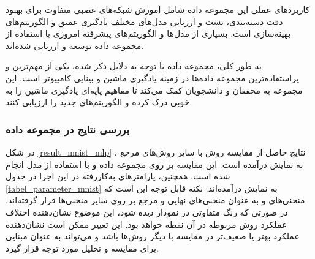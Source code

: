 کاربردهای عملی این مجموعه داده شامل آموزش شبکه‌های عصبی متفاوت برای بهبود دقت دسته‌بندی، تست و ارزیابی مدل‌های مختلف یادگیری عمیق و الگوریتم‌های بهینه‌سازی است. بسیاری از مدل‌ها و الگوریتم‌های پیشرفته امروزی با استفاده از مجموعه داده
توسعه و ارزیابی شده‌اند.

به طور کلی، مجموعه داده
با توجه به دلایل ذکر شده، یکی از مهم‌ترین و پراستفاده‌ترین مجموعه داده‌ها در زمینه یادگیری ماشین و بینایی کامپیوتر است. این مجموعه به محققان و دانشجویان کمک می‌کند تا مفاهیم پایه‌ای یادگیری ماشین را به خوبی درک کرده و الگوریتم‌های جدید را ارزیابی کنند.


\vspace{3mm}
\subsubsection{
	بررسی نتایج در مجموعه داده
}\vspace{-1mm}

در شکل
\ref{result_mnist_mlp}%
، نتایج حاصل از مقایسه روش
با سایر روش‌های مرجع به نمایش درآمده است. این مقایسه بر روی مجموعه داده
و با استفاده از مدل
انجام شده است. همچنین، پارامترهای به‌کاررفته در این اجرا در جدول
\ref{tabel_parameter_mnist} 
به نمایش درآمده‌اند. نکته قابل توجه این است که منحنی‌های
و
به عنوان منحنی‌های نهایی و مرجع بر روی سایر منحنی‌ها قرار گرفته‌اند. در صورتی که رنگ متفاوتی در نمودار دیده شود، این موضوع نشان‌دهنده اختلاف عملکرد روش مربوطه در آن نقطه خواهد بود. این تغییر ممکن است نشان‌دهنده عملکرد بهتر یا ضعیف‌تر در مقایسه با دیگر روش‌ها باشد و می‌تواند به عنوان مبنایی برای مقایسه و تحلیل مورد توجه قرار گیرد.


